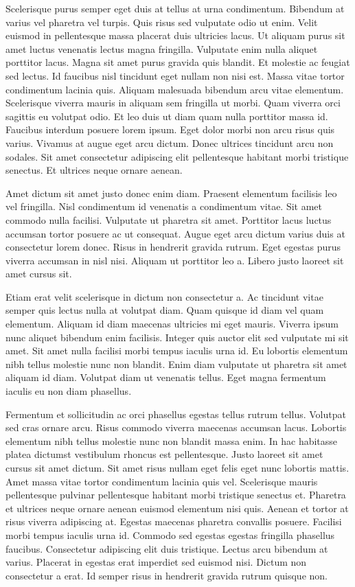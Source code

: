 \documentclass[11pt,a4paper]{article}
\begin{document}
Scelerisque purus semper eget duis at tellus at urna condimentum. Bibendum at varius vel pharetra vel turpis. Quis risus sed vulputate odio ut enim. Velit euismod in pellentesque massa placerat duis ultricies lacus. Ut aliquam purus sit amet luctus venenatis lectus magna fringilla. Vulputate enim nulla aliquet porttitor lacus. Magna sit amet purus gravida quis blandit. Et molestie ac feugiat sed lectus. Id faucibus nisl tincidunt eget nullam non nisi est. Massa vitae tortor condimentum lacinia quis. Aliquam malesuada bibendum arcu vitae elementum. Scelerisque viverra mauris in aliquam sem fringilla ut morbi. Quam viverra orci sagittis eu volutpat odio. Et leo duis ut diam quam nulla porttitor massa id. Faucibus interdum posuere lorem ipsum. Eget dolor morbi non arcu risus quis varius. Vivamus at augue eget arcu dictum. Donec ultrices tincidunt arcu non sodales. Sit amet consectetur adipiscing elit pellentesque habitant morbi tristique senectus. Et ultrices neque ornare aenean.

Amet dictum sit amet justo donec enim diam. Praesent elementum facilisis leo vel fringilla. Nisl condimentum id venenatis a condimentum vitae. Sit amet commodo nulla facilisi. Vulputate ut pharetra sit amet. Porttitor lacus luctus accumsan tortor posuere ac ut consequat. Augue eget arcu dictum varius duis at consectetur lorem donec. Risus in hendrerit gravida rutrum. Eget egestas purus viverra accumsan in nisl nisi. Aliquam ut porttitor leo a. Libero justo laoreet sit amet cursus sit.

Etiam erat velit scelerisque in dictum non consectetur a. Ac tincidunt vitae semper quis lectus nulla at volutpat diam. Quam quisque id diam vel quam elementum. Aliquam id diam maecenas ultricies mi eget mauris. Viverra ipsum nunc aliquet bibendum enim facilisis. Integer quis auctor elit sed vulputate mi sit amet. Sit amet nulla facilisi morbi tempus iaculis urna id. Eu lobortis elementum nibh tellus molestie nunc non blandit. Enim diam vulputate ut pharetra sit amet aliquam id diam. Volutpat diam ut venenatis tellus. Eget magna fermentum iaculis eu non diam phasellus.

Fermentum et sollicitudin ac orci phasellus egestas tellus rutrum tellus. Volutpat sed cras ornare arcu. Risus commodo viverra maecenas accumsan lacus. Lobortis elementum nibh tellus molestie nunc non blandit massa enim. In hac habitasse platea dictumst vestibulum rhoncus est pellentesque. Justo laoreet sit amet cursus sit amet dictum. Sit amet risus nullam eget felis eget nunc lobortis mattis. Amet massa vitae tortor condimentum lacinia quis vel. Scelerisque mauris pellentesque pulvinar pellentesque habitant morbi tristique senectus et. Pharetra et ultrices neque ornare aenean euismod elementum nisi quis. Aenean et tortor at risus viverra adipiscing at. Egestas maecenas pharetra convallis posuere. Facilisi morbi tempus iaculis urna id. Commodo sed egestas egestas fringilla phasellus faucibus. Consectetur adipiscing elit duis tristique. Lectus arcu bibendum at varius. Placerat in egestas erat imperdiet sed euismod nisi. Dictum non consectetur a erat. Id semper risus in hendrerit gravida rutrum quisque non.
\end{document}
